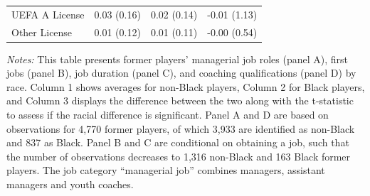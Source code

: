 \begin{table}[!ht]
{\begin{threeparttable}
\begin{tabular}{lccc}
UEFA A License & 0.03 (0.16) & 0.02 (0.14) & -0.01 (1.13) \\ 
Other License & 0.01 (0.12) & 0.01 (0.11) & -0.00 (0.54) \\ 
\hline
\end{tabular}
\begin{tablenotes}[flushleft]
		\item[] \scriptsize \textit{Notes:}
This table presents former players' managerial job roles (panel A), first jobs (panel B), job duration (panel C), and coaching qualifications (panel D) by race. Column 1 shows averages for non-Black players, Column 2 for Black players, and Column 3 displays the difference between the two along with the t-statistic to assess if the racial difference is significant. Panel A and D are based on observations for 4,770 former players, of which 3,933 are identified as non-Black and 837 as Black. Panel B and C are conditional on obtaining a job, such that the number of observations decreases to 1,316 non-Black and 163 Black former players. The job category ``managerial job'' combines managers, assistant managers and youth coaches.
		\end{tablenotes}
  \end{threeparttable}
  }
\end{table}
